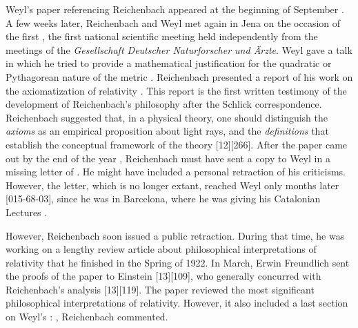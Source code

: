 \documentclass[final]{article}
\begin{document}
Weyl's paper referencing Reichenbach appeared at the beginning of September \citep{Weyl1921e}. A few weeks later, Reichenbach and Weyl met again in Jena on the occasion of the first  , the first national scientific meeting held independently from the meetings of the \textit{Gesellschaft Deutscher Naturforscher und Ärzte}. Weyl gave a talk in which he tried to provide a mathematical justification for the quadratic or Pythagorean nature of the metric \citep{Weyl1921f}. Reichenbach presented a report of his work on the axiomatization of relativity \citep{Reichenbach1921d}. This report is the first written testimony of the development of Reichenbach's philosophy after the Schlick correspondence. Reichenbach suggested that, in a physical theory, one should distinguish the \emph{axioms} as an empirical proposition about light rays, \rac\etc and the \emph{definitions} that establish the conceptual framework of the theory [12][266]. After the paper came out by the end of the year \citep{Reichenbach1921d}, Reichenbach must have sent a copy to Weyl in a missing letter of . He might have included a personal retraction of his criticisms. However, the letter, which is no longer extant, reached Weyl only months later [015-68-03], since he was in Barcelona, where he was giving his Catalonian Lectures \citep{Weyl1923}.

However, Reichenbach soon issued a public retraction. During that time, he was working on a lengthy review article about philosophical interpretations of relativity that he finished in the Spring of 1922. In March, Erwin Freundlich sent the proofs of the paper to Einstein [13][109], who generally concurred with Reichenbach's analysis [13][119]. The paper reviewed the most significant philosophical interpretations of relativity. However, it also included a last section on Weyl's \uft:  \citep[365]{Reichenbach1922a}, Reichenbach commented.
\end{document}
